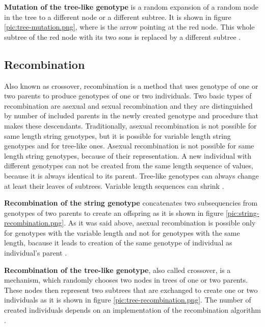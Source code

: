 \textbf{Mutation of the tree-like genotype} is a random expansion of a random node in the tree to a different node or a different subtree. It is shown in figure \ref{pic:tree-mutation.png}, where is the arrow pointing at the red node. This whole subtree of the red node with its two sons is replaced by a different subtree \cite{genetic-programming}.

\clearpage

\subsection{Recombination}
Also known as crossover, recombination is a method that uses genotype of one or two parents to produce genotypes of one or two individuals. Two basic types of recombination are asexual and sexual recombination and they are distinguished by number of included parents in the newly created genotype and procedure that makes these descendants. Traditionally, asexual recombination is not possible for same length string genotypes, but it is possible for variable length string genotypes and for tree-like ones. Asexual recombination is not possible for same length string genotypes, because of their representation. A new individual with different genotypes can not be created from the same length sequence of values, because it is always identical to its parent. Tree-like genotypes can always change at least their leaves of subtrees. Variable length sequences can shrink .

\textbf{Recombination of the string genotype} concatenates two subsequencies from genotypes of two parents to create an offspring as it is shown in figure \ref{pic:string-recombination.png}. As it was said above, asexual recombination is possible only for genotypes with the variable length and not for genotypes with the same length, bacause it leads to creation of the same genotype of individual as individual's parent \cite{evolutionary-algorithms}.

\textbf{Recombination of the tree-like genotype}, also called crossover, is a mechanism, which randomly chooses two nodes in trees of one or two parents. These nodes then represent two subtrees that are exchanged to create one or two individuals as it is shown in figure \ref{pic:tree-recombination.png}. The number of created individuals depends on an implementation of the recombination algorithm \cite{genetic-programming}.

\clearpage
